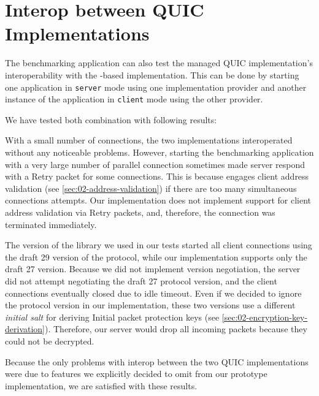\section{Interop between QUIC Implementations}

The benchmarking application can also test the managed QUIC implementation's interoperability with
the \libmsquic{}-based implementation. This can be done by starting one application in
\texttt{server} mode using one implementation provider and another instance of the application in
\texttt{client} mode using the other provider.

We have tested both combination with following results:

\begin{itemize}

   With a small number of connections, the two
implementations interoperated without any noticeable problems. However, starting the benchmarking
application with a very large number of parallel connection sometimes made \libmsquic{} server
respond with a Retry packet for some connections. This is because \libmsquic{} engages client
address validation (see \autoref{sec:02-address-validation}) if there are too many simultaneous
connections attempts. Our implementation does not implement support for client address validation
via Retry packets, and, therefore, the connection was terminated immediately.

   The version of the \libmsquic{} library we used in
our tests started all client connections using the draft 29 version of the protocol, while our
implementation supports only the draft 27 version. Because we did not implement version negotiation,
the server did not attempt negotiating the draft 27 protocol version, and the \libmsquic{} client
connections eventually closed due to idle timeout. Even if we decided to ignore the protocol version
in our implementation, these two versions use a different \textit{initial salt} for deriving Initial
packet protection keys (see \autoref{sec:02-encryption-key-derivation}). Therefore, our server would
drop all incoming packets because they could not be decrypted.

\end{itemize}

Because the only problems with interop between the two QUIC implementations were due to features we
explicitly decided to omit from our prototype implementation, we are satisfied with these results.

